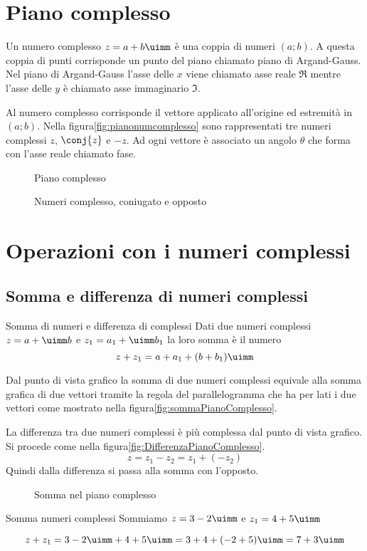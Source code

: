 \section{Piano complesso}
Un numero complesso $z=a+b\uimm$ è una coppia di numeri $(a;b)$. A questa coppia di punti corrisponde un punto del piano chiamato piano di  Argand-Gauss. 
Nel piano di Argand-Gauss l'asse delle $x$ viene chiamato asse reale $\Re$ mentre l'asse delle $y$ è chiamato asse immaginario $\Im$.\par
Al numero complesso corrisponde il vettore applicato all'origine ed estremità in $(a;b)$. Nella figura\nobs\vref{fig:pianonumcomplesso} sono rappresentati tre numeri complessi $z$, $\conj{z}$ e $-z$. Ad ogni vettore è associato un angolo $\theta$ che forma con l'asse reale chiamato fase. 
\begin{figure}
	\centering
	
	\caption{Piano complesso}
	\label{fig:nuncomplPianoComplesso}
\end{figure}
\begin{figure} %
	\centering

	\caption{Numeri complesso, coniugato e opposto}
	\label{fig:pianonumcomplesso}
\end{figure}
\section{Operazioni con i numeri complessi}
\label{sec:NumCompOperazioni}
\subsection{Somma e differenza di numeri complessi}
\begin{definizionet}{Somma di numeri e differenza di complessi}{}
Dati due numeri complessi  $z=a+\uimm b$ e  $z_1=a_1+\uimm b_1$ la loro somma è il numero \[z+z_1=a+a_1+(b+b_1)\uimm\]
\end{definizionet}
Dal punto di vista grafico la somma di due numeri complessi equivale alla somma grafica di due vettori tramite la regola del parallelogramma che ha per lati i due vettori come mostrato nella figura\nobs\vref{fig:sommaPianoComplesso}.

La differenza tra due numeri complessi è più complessa dal punto di vista grafico. Si procede come nella figura\nobs\vref{fig:DifferenzaPianoComplesso}. \[ z=z_1-z_2=z_1+(-z_2)\]  Quindi dalla differenza si passa alla somma con l'opposto.
\begin{figure}
	\centering
	
	\caption{Somma nel piano complesso}
	\label{fig:sommaPianoComplesso}
\end{figure}
\begin{esempiot}{Somma numeri complessi}{}
Sommiamo $z=3-2\uimm$ e $z_1=4+5\uimm$
\end{esempiot}
	\[z+z_1=3-2\uimm +4+5\uimm=3+4+(-2+5)\uimm=7+3\uimm\]

